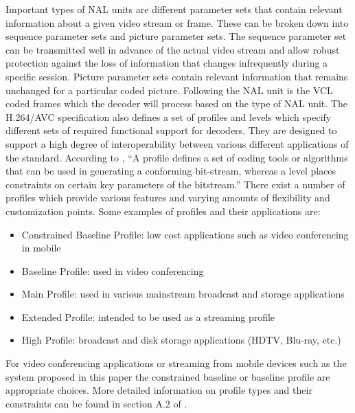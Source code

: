 \documentclass[preprint, 12pt]{elsarticle}
\begin{document}
Important types of NAL units are different parameter sets that contain relevant information about a given video stream or frame. These can be broken down into sequence parameter sets and picture parameter sets. The sequence parameter set can be transmitted well in advance of the actual video stream and allow robust protection against the loss of information that changes infrequently during a specific session. Picture parameter sets contain relevant information that remains unchanged for a particular coded picture. Following the NAL unit is the VCL coded frames which the decoder will process based on the type of NAL unit. The H.264/AVC specification also defines a set of profiles and levels which specify different sets of required functional support for decoders. They are designed to support a high degree of interoperability between various different applications of the standard. According to \cite{H264AVCOverview}, ``A profile defines a set of coding tools or algorithms that can be used in generating a conforming bit-stream, whereas a level places constraints on certain key parameters of the bitstream.'' There exist a number of profiles which provide various features and varying amounts of flexibility and customization points. Some examples of profiles and their applications are:
\begin{itemize}
\item Constrained Baseline Profile: low cost applications such as video conferencing in mobile
\item Baseline Profile: used in video conferencing
\item Main Profile: used in various mainstream broadcast and storage applications
\item  Extended Profile: intended to be used as a streaming profile
\item  High Profile: broadcast and disk storage applications (HDTV, Blu-ray, etc.)
\end{itemize}
For video conferencing applications or streaming from mobile devices such as the system proposed in this paper the constrained baseline or baseline profile are appropriate choices. More detailed information on profile types and their constraints can be found in section A.2 of \cite{H264Spec}.
\end{document}
